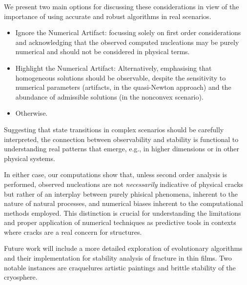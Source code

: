 We present two main options for discussing these considerations in view of the importance of using accurate and robust algorithms in real scenarios.

\begin{itemize}
    \item 
    Ignore the Numerical Artifact: focussing solely on first order considerations and acknowledging that the observed computed nucleations may be purely numerical and should not be considered in physical terms.
    \item 
    Highlight the Numerical Artifact: Alternatively, emphasising that homogeneous solutions should be observable, despite 
    the sensitivity to numerical parameters (artifacts, in the quasi-Newton approach) and the abundance of admissible solutions (in the nonconvex scenario).
    \item 
    Otherwise.
\end{itemize}

Suggesting that state transitions in complex scenarios should be carefully interpreted, the connection between observability and stability is functional to understanding real patterns that emerge, e.g., in higher dimensions or in other physical systems.

In either case, our computations show that, unless second order analysis is performed, observed nucleations are not \emph{necessarily} indicative of physical cracks but rather of an interplay between purely phisical phenomena, inherent to the nature of natural processes, and numerical biases inherent to the computational methods employed. This distinction is crucial for understanding the limitations and proper application of numerical techniques as predictive tools in contexts where cracks are a real concern for structures.

Future work will include a more detailed exploration of evolutionary algorithms and their implementation for stability analysis of fracture in thin films. Two notable instances are craquelures artistic paintings and brittle stability of the cryosphere.



\clearpage




